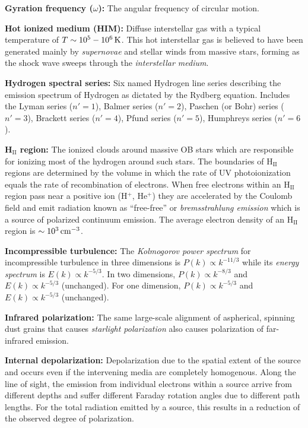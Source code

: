 \documentclass[a4paper,11pt]{article}
\begin{document}
{\noindent}\textbf{Gyration frequency ($\omega$):} The angular frequency of circular motion.

{\noindent}\textbf{Hot ionized medium (HIM):} Diffuse interstellar gas with a typical temperature of $T\sim10^5-10^6\,{\rm K}$. This hot interstellar gas is believed to have been generated mainly by \textit{supernovae} and stellar winds from massive stars, forming as the shock wave sweeps through the \textit{interstellar medium}.

{\noindent}\textbf{Hydrogen spectral series:} Six named Hydrogen line series describing the emission spectrum of Hydrogen as dictated by the Rydberg equation. Includes the Lyman series ($n'=1$), Balmer series ($n'=2$), Paschen (or Bohr) series ($n'=3$), Brackett series ($n'=4$), Pfund series ($n'=5$), Humphreys series ($n'=6$).

{\noindent}\textbf{H$_\mathrm{II}$ region:} The ionized clouds around massive OB stars which are responsible for ionizing most of the hydrogen around such stars. The boundaries of H$_\mathrm{II}$ regions are determined by the volume in which the rate of UV photoionization equals the rate of recombination of electrons. When free electrons within an H$_\mathrm{II}$ region pass near a positive ion (H$^+$, He$^+$) they are accelerated by the Coulomb field and emit radiation known as ``free-free'' or \textit{bremsstrahlung emission} which is a source of polarized continuum emission. The average electron density of an H$_\mathrm{II}$ region is $\sim10^3\,{\rm cm^{-3}}$.

{\noindent}\textbf{Incompressible turbulence:} The \textit{Kolmogorov power spectrum} for incompressible turbulence in three dimensions is $P(k)\propto k^{-11/3}$ while its \textit{energy spectrum} is $E(k)\propto k^{-5/3}$. In two dimensions, $P(k)\propto k^{-8/3}$ and $E(k)\propto k^{-5/3}$ (unchanged). For one dimension, $P(k)\propto k^{-5/3}$ and $E(k)\propto k^{-5/3}$ (unchanged).

{\noindent}\textbf{Infrared polarization:} The same large-scale alignment of aspherical, spinning dust grains that causes \textit{starlight polarization} also causes polarization of far-infrared emission.

{\noindent}\textbf{Internal depolarization:} Depolarization due to the spatial extent of the source and occurs even if the intervening media are completely homogenous. Along the line of sight, the emission from individual electrons within a source arrive from different depths and suffer different Faraday rotation angles due to different path lengths. For the total radiation emitted by a source, this results in a reduction of the observed degree of polarization.
\end{document}
